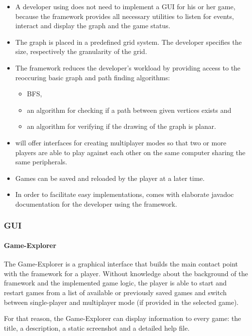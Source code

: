 \begin{itemize}
	\item A \gls{developer} using \graphioli does not need to implement a \gls{GUI} for his or her game, because the framework provides all necessary utilities to listen for events, interact and display the graph and the game status.

	\item The graph is placed in a predefined grid system. The developer specifies the size, respectively the granularity of the grid.

	\item The framework reduces the developer's workload by providing access to the reoccuring basic graph and \gls{path} finding algorithms:
	\begin{itemize}
		\item \gls{BFS},
		\item an algorithm for checking if a path between given vertices exists and
		\item an algorithm for verifying if the drawing of the graph is \gls{planar}.
	\end{itemize}

	\item \graphioli will offer interfaces for creating multiplayer modes so that two or more \glspl{player} are able to play against each other on the same computer sharing the same peripherals.

	\item Games can be saved and reloaded by the player at a later time.

	\item In order to facilitate easy implementations, \graphioli comes with elaborate \Gls{javadoc} documentation for the developer using the framework.

\end{itemize}

\subsubsection{GUI}

\paragraph*{Game-Explorer}
The Game-Explorer is a graphical interface that builds the main contact point with the framework for a \gls{player}. Without knowledge about the background of the framework and the implemented \gls{game} logic, the player is able to start and restart games from a list of available or previously saved games and switch between single-player and multiplayer mode (if provided in the selected game).\par
For that reason, the Game-Explorer can display information to every game: the title, a description, a static screenshot and a detailed help file.
